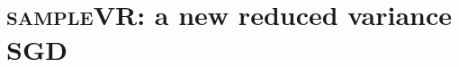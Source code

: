 \documentclass[letterpaper]{article}
\begin{document}





\section{\textsc{sampleVR}: a new reduced variance SGD}
\label{sect_sample_vr}
\end{document}
